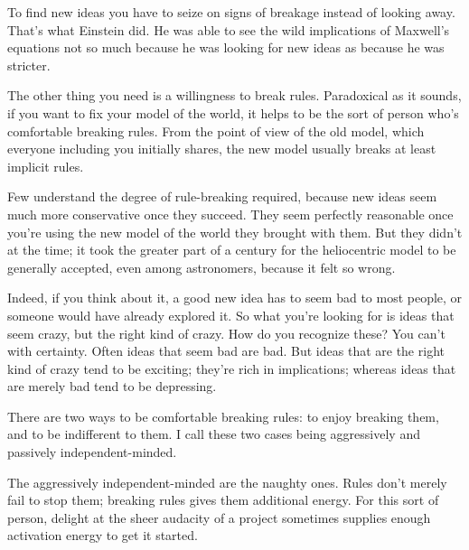 To find new
                  ideas you have to seize on signs of breakage instead of
                  looking away. That's what Einstein did. He was able to see the
                  wild implications of Maxwell's equations not so much because
                  he was looking for new ideas as because he was stricter.

The
                  other thing you need is a willingness to break rules.
                  Paradoxical as it sounds, if you want to fix your model of the
                  world, it helps to be the sort of person who's comfortable
                  breaking rules. From the point of view of the old model, which
                  everyone including you initially shares, the new model usually
                  breaks at least implicit rules.

Few understand the
                  degree of rule-breaking required, because new ideas seem much
                  more conservative once they succeed. They seem perfectly
                  reasonable once you're using the new model of the world they
                  brought with them. But they didn't at the time; it took the
                  greater part of a century for the heliocentric model to be
                  generally accepted, even among astronomers, because it felt so
                  wrong.

Indeed, if you think about it, a good new
                  idea has to seem bad to most people, or someone would have
                  already explored it. So what you're looking for is ideas that
                  seem crazy, but the right kind of crazy. How do you recognize
                  these? You can't with certainty. Often ideas that seem bad are
                  bad. But ideas that are the right kind of crazy tend to be
                  exciting; they're rich in implications; whereas ideas that are
                  merely bad tend to be depressing.

There are two
                  ways to be comfortable breaking rules: to enjoy breaking them,
                  and to be indifferent to them. I call these two cases being
                  aggressively and passively independent-minded.

The
                  aggressively independent-minded are the naughty ones. Rules
                  don't merely fail to stop them; breaking rules gives them
                  additional energy. For this sort of person, delight at the
                  sheer audacity of a project sometimes supplies enough
                  activation energy to get it started.

